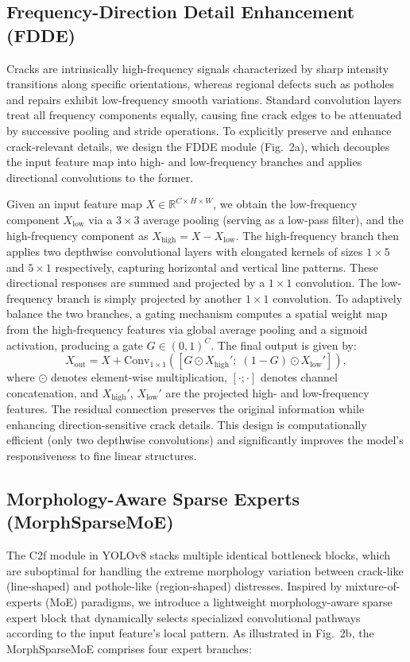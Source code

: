 \documentclass[twocolumn]{sn-jnl}
\begin{document}
	\subsection{Frequency-Direction Detail Enhancement (FDDE)}
	Cracks are intrinsically high-frequency signals characterized by sharp intensity transitions along specific orientations, whereas regional defects such as potholes and repairs exhibit low-frequency smooth variations. Standard convolution layers treat all frequency components equally, causing fine crack edges to be attenuated by successive pooling and stride operations. To explicitly preserve and enhance crack-relevant details, we design the FDDE module (Fig.~2a), which decouples the input feature map into high- and low-frequency branches and applies directional convolutions to the former.
	
	Given an input feature map \(X \in \mathbb{R}^{C \times H \times W}\), we obtain the low-frequency component \(X_{\text{low}}\) via a \(3\times3\) average pooling (serving as a low-pass filter), and the high-frequency component as \(X_{\text{high}} = X - X_{\text{low}}\). The high-frequency branch then applies two depthwise convolutional layers with elongated kernels of sizes \(1\times5\) and \(5\times1\) respectively, capturing horizontal and vertical line patterns. These directional responses are summed and projected by a \(1\times1\) convolution. The low-frequency branch is simply projected by another \(1\times1\) convolution. To adaptively balance the two branches, a gating mechanism computes a spatial weight map from the high-frequency features via global average pooling and a sigmoid activation, producing a gate \(G \in (0,1)^C\). The final output is given by:
	\[
	X_{\text{out}} = X + \text{Conv}_{1\times1}\left( \left[ G \odot X_{\text{high}}';\; (1-G) \odot X_{\text{low}}' \right] \right),
	\]
	where \(\odot\) denotes element-wise multiplication, \([\cdot;\cdot]\) denotes channel concatenation, and \(X_{\text{high}}'\), \(X_{\text{low}}'\) are the projected high- and low-frequency features. The residual connection preserves the original information while enhancing direction-sensitive crack details. This design is computationally efficient (only two depthwise convolutions) and significantly improves the model's responsiveness to fine linear structures.
	
	\subsection{Morphology-Aware Sparse Experts (MorphSparseMoE)}
	The C2f module in YOLOv8 stacks multiple identical bottleneck blocks, which are suboptimal for handling the extreme morphology variation between crack-like (line-shaped) and pothole-like (region-shaped) distresses. Inspired by mixture-of-experts (MoE) paradigms, we introduce a lightweight morphology-aware sparse expert block that dynamically selects specialized convolutional pathways according to the input feature's local pattern. As illustrated in Fig.~2b, the MorphSparseMoE comprises four expert branches:
	
\end{document}
